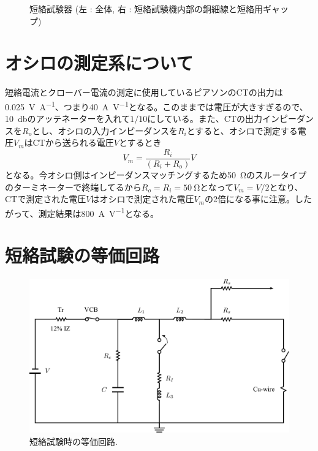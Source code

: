 \documentclass[book,openany]{jlreq}
\theoremstyle{definition}
\begin{document}
\begin{figure}[htbp]
\begin{minipage}[b]{0.45\linewidth}
  \end{minipage}
  \caption{短絡試験器 (左 : 全体, 右 : 短絡試験機内部の銅細線と短絡用ギャップ)}
  \label{fig:Tanraku}
\end{figure}

\section{オシロの測定系について}
短絡電流とクローバー電流の測定に使用しているピアソンのCTの出力は\SI{0.025}{V\per A}、つまり\SI{40}{A\per V}となる。このままでは電圧が大きすぎるので、\SI{10}{\decibel}のアッテネーターを入れて$1/10$にしている。また、CTの出力インピーダンスを$R_o$とし、オシロの入力インピーダンスを$R_i$とすると、オシロで測定する電圧$V_m$はCTから送られる電圧$V$とするとき
%
\begin{equation}
  V_m = \frac{R_i}{(R_i + R_o)} V
\end{equation}
%
となる。今オシロ側はインピーダンスマッチングするため\SI{50}{\ohm}のスルータイプのターミネーターで終端してるから$R_o=R_i=\SI{50}{\ohm}$となって$V_m=V/2$となり、CTで測定された電圧$V$はオシロで測定された電圧$V_m$の2倍になる事に注意。したがって、測定結果は\SI{800}{A\per V}となる。

\section{短絡試験の等価回路}
\begin{figure}[htbp]
  \begin{center}
    \includegraphics[width=12cm]{figs/Equivalent_Circuit.pdf}
    \caption{短絡試験時の等価回路.}
    \label{fig:Equivalent_Circuit}
  \end{center}
\end{figure}
\end{document}
